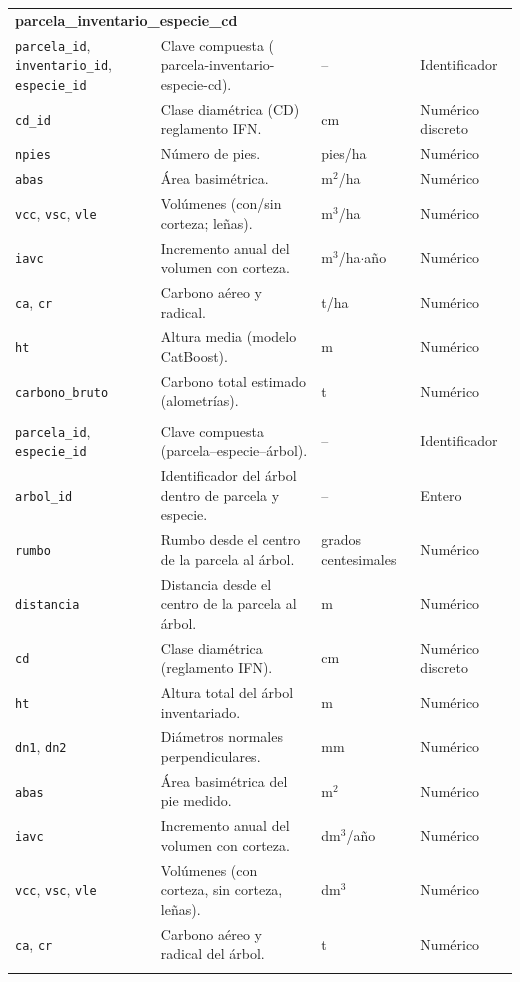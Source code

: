 \begin{longtable}{p{3.2cm} p{7.6cm} p{2.4cm} p{2.4cm}}
\multicolumn{4}{l}{\textbf{parcela\_inventario\_especie\_cd}} \\
\texttt{parcela\_id}, \texttt{inventario\_id}, \texttt{especie\_id} & Clave compuesta ( parcela-inventario-especie-cd). & -- & Identificador \\
\texttt{cd\_id} & Clase diamétrica (CD) reglamento IFN. & cm & Numérico discreto \\
\texttt{npies} & Número de pies. & pies/ha & Numérico \\
\texttt{abas} & Área basimétrica. & m$^{2}$/ha & Numérico \\
\texttt{vcc}, \texttt{vsc}, \texttt{vle} & Volúmenes (con/sin corteza; leñas). & m$^{3}$/ha & Numérico \\
\texttt{iavc} & Incremento anual del volumen con corteza. & m$^{3}$/ha$\cdot$año & Numérico \\
\texttt{ca}, \texttt{cr} & Carbono aéreo y radical. & t/ha & Numérico \\
\texttt{ht} & Altura media (modelo CatBoost). & m & Numérico \\
\texttt{carbono\_bruto} & Carbono total estimado (alometrías). & t & Numérico \\
\addlinespace

\multicolumn{4}{l}{\textbf{parcela\_especie\_arbol}} \\
\texttt{parcela\_id}, \texttt{especie\_id} & Clave compuesta (parcela–especie–árbol). & -- & Identificador \\ 
\texttt{arbol\_id} & Identificador del árbol dentro de parcela y especie. & -- & Entero \\ 
\texttt{rumbo} & Rumbo desde el centro de la parcela al árbol. & grados centesimales & Numérico \\ 
\texttt{distancia} & Distancia desde el centro de la parcela al árbol. & m & Numérico \\ 
\texttt{cd} & Clase diamétrica (reglamento IFN). & cm & Numérico discreto \\ 
\texttt{ht} & Altura total del árbol inventariado. & m & Numérico \\ 
\texttt{dn1}, \texttt{dn2} & Diámetros normales perpendiculares. & mm & Numérico \\ 
\texttt{abas} & Área basimétrica del pie medido. & m$^{2}$ & Numérico \\ 
\texttt{iavc} & Incremento anual del volumen con corteza. & dm$^{3}$/año & Numérico \\ 
\texttt{vcc}, \texttt{vsc}, \texttt{vle} & Volúmenes (con corteza, sin corteza, leñas). & dm$^{3}$ & Numérico \\ 
\texttt{ca}, \texttt{cr} & Carbono aéreo y radical del árbol. & t & Numérico \\
\addlinespace


\end{longtable}
